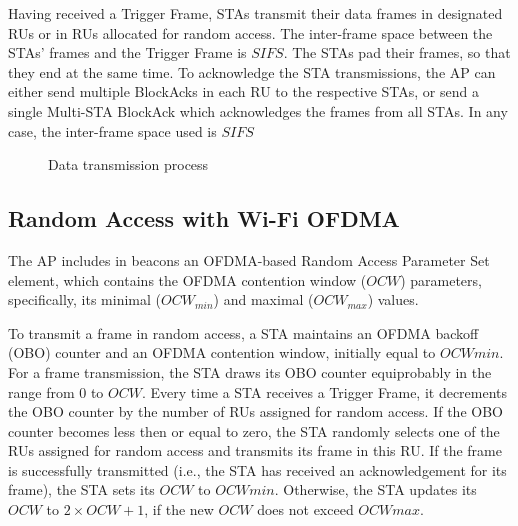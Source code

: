 Having received a Trigger Frame, STAs transmit their data frames in designated RUs or in RUs allocated for random access.
The inter-frame space between the STAs' frames and the Trigger Frame is $SIFS$.
The STAs pad their frames, so that they end at the same time.
To acknowledge the STA transmissions, the AP can either send multiple BlockAcks in each RU to the respective STAs, or send a single Multi-STA BlockAck which acknowledges the frames from all STAs.
In any case, the inter-frame space used is $SIFS$

\begin{figure}[tb]
	\centering
	\caption{\label{fig:transmission} Data transmission process}
\end{figure}


\subsection{Random Access with Wi-Fi OFDMA}
The AP includes in beacons an OFDMA-based Random Access Parameter Set element, which contains the OFDMA contention window ($OCW$) parameters, specifically, its minimal ($OCW_{min}$) and maximal ($OCW_{max}$) values.

To transmit a frame in random access, a STA maintains an OFDMA backoff (OBO) counter and an OFDMA contention window, initially equal to $OCWmin$.
For a frame transmission, the STA draws its OBO counter equiprobably in the range from $0$ to $OCW$.
Every time a STA receives a Trigger Frame, it decrements the OBO counter by the number of RUs assigned for random access.
If the OBO counter becomes less then or equal to zero, the STA randomly selects one of the RUs assigned for random access and transmits its frame in this RU.
If the frame is successfully transmitted (i.e., the STA has received an acknowledgement for its frame), the STA sets its $OCW$ to $OCWmin$.
Otherwise, the STA updates its $OCW$ to $2 \times OCW + 1$, if the new $OCW$ does not exceed $OCWmax$.

